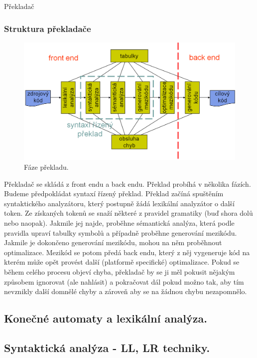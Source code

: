 \begin{definiceN}{Překladač}
\subsubsection{Struktura překladače}
\begin{figure}[h]
	\centering
	\includegraphics[width=15cm]{i2/softwarove_inzenyrstvi/obrazky/Faze_prekladu.png}
	\caption{Fáze překladu.}
	\label{pic:Prekladac-cerna_skrinka}
\end{figure}
Překladač se skládá z front endu a back endu. Překlad probíhá v několika fázích. Budeme předpokládat syntaxí řízený překlad. Překlad začíná spuštěním syntaktického analyzátoru, který postupně žádá lexikální analyzátor o další token. Ze získaných tokenů se snaží  některé z pravidel gramatiky (buď shora dolů nebo naopak). Jakmile jej najde, proběhne sémantická analýza, která podle pravidla upraví tabulky symbolů a případně proběhne generování mezikódu. Jakmile je dokončeno generování mezikódu, mohou na něm proběhnout optimalizace. Mezikód se potom předá back endu, který z něj vygeneruje kód na kterém může opět provést další (platformě specifické) optimalizace. Pokud se během celého procesu objeví chyba, překladač by se ji měl pokusit nějakým způsobem ignorovat (ale nahlásit) a pokračovat dál pokud možno tak, aby tím nevznikly další domnělé chyby a zároveň aby se na žádnou chybu nezapomnělo.




\subsection{Konečné automaty a lexikální analýza.}





\subsection{Syntaktická analýza - LL, LR techniky.}


\end{definiceN}
